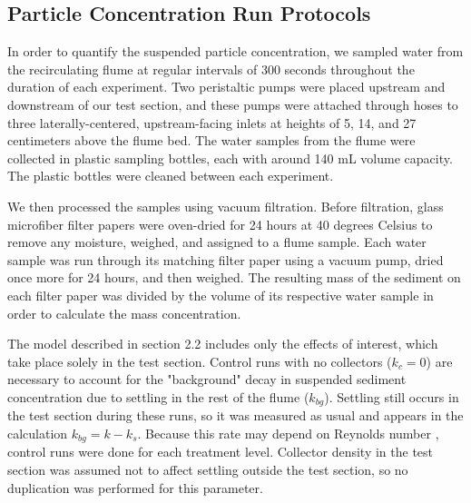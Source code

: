 \documentclass{scrreprt}
\begin{document}
\subsection{Particle Concentration Run Protocols}

In order to quantify the suspended particle concentration, we sampled water from the recirculating flume at regular intervals of 300 seconds throughout the duration of each experiment. Two peristaltic pumps were placed upstream and downstream of our test section, and these pumps were attached through hoses to three laterally-centered, upstream-facing inlets at heights of 5, 14, and 27 centimeters above the flume bed. The water samples from the flume were collected in plastic sampling bottles, each with around 140 mL volume capacity. The plastic bottles were cleaned between each experiment. 

We then processed the samples using vacuum filtration. Before filtration, glass microfiber filter papers were oven-dried for 24 hours at 40 degrees Celsius to remove any moisture, weighed, and assigned to a flume sample. Each water sample was run through its matching filter paper using a vacuum pump, dried once more for 24 hours, and then weighed. The resulting mass of the sediment on each filter paper was divided by the volume of its respective water sample in order to calculate the mass concentration.

The model described in section 2.2 includes only the effects of interest, which take place solely in the test section. Control runs with no collectors ($k_c = 0$) are necessary to account for the "background" decay in suspended sediment concentration due to settling in the rest of the flume ($k_{bg}$). Settling still occurs in the test section during these runs, so it was measured as usual and appears in the calculation $k_{bg} = k - k_s$. Because this rate may depend on Reynolds number \citep{Nielsen_1993, Jacobs_2016, Wang_2018}, control runs were done for each treatment level. Collector density in the test section was assumed not to affect settling outside the test section, so no duplication was performed for this parameter.

\end{document}
